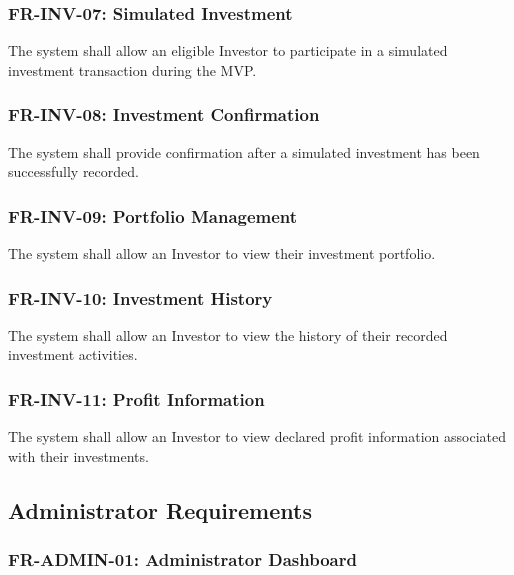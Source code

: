 \subsubsection{FR-INV-07: Simulated Investment}

The system shall allow an eligible Investor to participate in a simulated
investment transaction during the MVP.

\subsubsection{FR-INV-08: Investment Confirmation}

The system shall provide confirmation after a simulated investment has been
successfully recorded.

\subsubsection{FR-INV-09: Portfolio Management}

The system shall allow an Investor to view their investment portfolio.

\subsubsection{FR-INV-10: Investment History}

The system shall allow an Investor to view the history of their recorded
investment activities.

\subsubsection{FR-INV-11: Profit Information}

The system shall allow an Investor to view declared profit information
associated with their investments.



\subsection{Administrator Requirements}

\subsubsection{FR-ADMIN-01: Administrator Dashboard}

